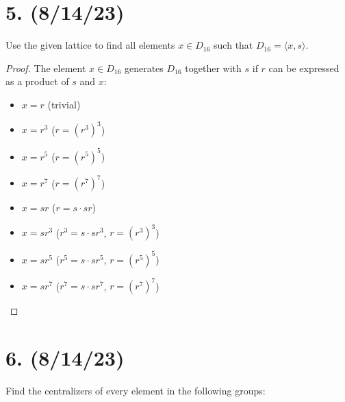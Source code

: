 \documentclass{article}
\begin{document}
\section*{5. (8/14/23)}

Use the given lattice to find all elements $x \in D_{16}$ such that $D_{16} = \langle x, s \rangle$.

\begin{proof}
    The element $x \in D_{16}$ generates $D_{16}$ together with $s$ if $r$ can be expressed as a product of $s$ and $x$:
    \begin{itemize}[itemsep=0em]
        \item $x = r$ (trivial)
        \item $x = r^3$ ($r = (r^3)^3$)
        \item $x = r^5$ ($r = (r^5)^5$)
        \item $x = r^7$ ($r = (r^7)^7$)
        \item $x = sr$ ($r = s \cdot sr$)
        \item $x = sr^3$ ($r^3 = s \cdot sr^3$, $r = (r^3)^3$)
        \item $x = sr^5$ ($r^5 = s \cdot sr^5$, $r = (r^5)^5$)
        \item $x = sr^7$ ($r^7 = s \cdot sr^7$, $r = (r^7)^7$)
    \end{itemize}
\end{proof}

\section*{6. (8/14/23)}

Find the centralizers of every element in the following groups:
\end{document}
